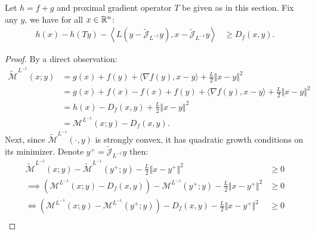 \documentclass[12pt]{article}
\begin{document}
    \begin{theorem}
    \label{app:thm:fun-thm-prox-grad}
        Let $h = f + g$ and proximal gradient operator $T$ be given as in this section. 
        Fix any $y$, we have for all $x \in \mathbb R^n$: 
        \begin{align*}
            h(x) - h(Ty) - 
            \left\langle 
                L(y - \widetilde{\mathcal J}_{L^{-1}} y),
                x - \widetilde {\mathcal J}_{L^{-1}}y
            \right\rangle
            &\ge  D_f(x, y) . 
        \end{align*}  
    \end{theorem}
    \begin{proof}
        By a direct observation: 
        \begin{align*}
            \widetilde{\mathcal M}^{L^{-1}}(x; y) 
            &= 
            g(x) + f(y) + \langle \nabla f(y), x - y\rangle + \frac{L}{2}\Vert x - y\Vert^2
            \\
            &= 
            g(x) + f(x) - f(x) + f(y) 
            + \langle \nabla f(y), x - y\rangle + \frac{L}{2}\Vert x - y\Vert^2
            \\
            &= 
            h(x) - D_f(x, y) + \frac{L}{2}\Vert x - y\Vert^2 
            \\
            &= \mathcal M^{L^{-1}}(x; y) - D_f(x, y). 
        \end{align*}
        Next, since $\widetilde{\mathcal M}^{L^{-1}}(\cdot, y)$ is strongly convex, it has quadratic growth conditions on its minimizer. 
        Denote $y^+ = \widetilde{\mathcal J}_{L^{-1}}y$ then: 
        {\small
        \begin{align*}
            \widetilde{\mathcal M}^{L^{-1}}(x; y) - 
            \widetilde{\mathcal M}^{L^{-1}}(y^+; y)
            - 
            \frac{L}{2}\Vert x - y^+\Vert^2
            &\ge 
            0
            \\
            \implies 
            \left(
                \mathcal M^{L^{-1}}(x; y) - D_f(x, y)
            \right) - 
            \mathcal M^{L^{-1}}(y^+; y) 
            - 
            \frac{L}{2}\Vert x - y^+\Vert^2
            &\ge 0
            \\
            \iff 
            \left(
                \mathcal M^{L^{-1}}(x; y)
                - 
                \mathcal M^{L^{-1}}(y^+; y)
            \right)
            - 
            D_f(x, y) 
            - \frac{L}{2}\Vert x - y^+\Vert^2
            &\ge 0
            \\

\end{align*}}
\end{proof}
\end{document}
